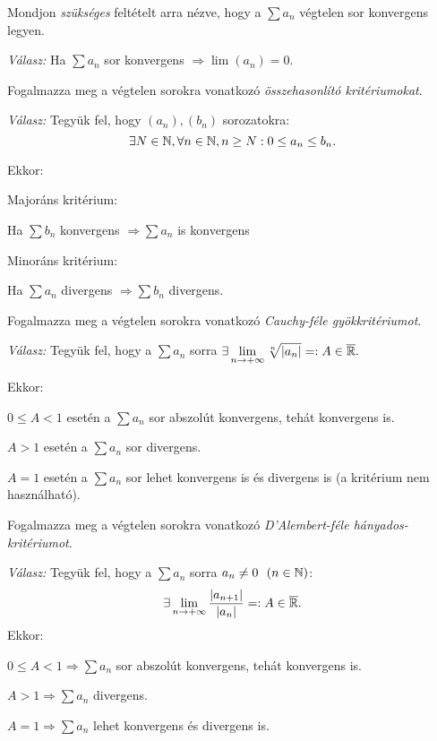 \documentclass[a4paper,12pt]{article}
\begin{document}
\begin{compactenum}
		\bigskip 
		\item Mondjon \emph{szükséges} feltételt arra nézve, hogy a $\sum a_n$ végtelen sor konvergens legyen.
		
		\emph{Válasz: } Ha $\sum a_n$ sor konvergens $\Rightarrow \lim(a_n)=0$.
		
		\bigskip 
		\item Fogalmazza meg a végtelen sorokra vonatkozó \emph{összehasonlító kritériumokat}.
		
		\emph{Válasz: } Tegyük fel, hogy $(a_n), (b_n)$ sorozatokra:
		\[\exists N \in \mathbb{N}, \forall n \in \mathbb{N}, n\ge N : 0\leq a_n \leq b_n.\]
		
		Ekkor:
		\begin{compactenum}
			\item Majoráns kritérium:
			
			Ha $\sum b_n$ konvergens $\Rightarrow \sum a_n$ is konvergens
			\item Minoráns kritérium:
			
			Ha $\sum a_n$ divergens $\Rightarrow \sum b_n$ divergens.
		\end{compactenum}
		
		\bigskip 
		\item Fogalmazza meg a végtelen sorokra vonatkozó \emph{Cauchy-féle gyökkritériumot}.
		
		\emph{Válasz:} Tegyük fel, hogy a $\sum a_n$ sorra $\exists\displaystyle\lim_{n\to +\infty} \sqrt[n]{|a_n|}=:A\in \overline{\mathbb{R}}.$
		
		Ekkor:
		\begin{compactitem}
			\item $0 \leq A <1$ esetén a $\sum a_n$ sor abszolút konvergens, tehát konvergens is.
			\item $A>1$ esetén a $\sum a_n$ sor divergens.
			\item $A=1$ esetén a $\sum a_n$ sor lehet konvergens is és divergens is (a kritérium nem használható).
		\end{compactitem}
		
		\bigskip 
		\item Fogalmazza meg a végtelen sorokra vonatkozó \emph{D’Alembert-féle hányados-kritériumot}.
		
		\emph{Válasz: } Tegyük fel, hogy a $\sum a_n$ sorra $a_n\not=0~~(n\in \mathbb{N})$:
		\[ \exists\lim_{n\to +\infty}\frac{|a_{n+1}|}{|a_n|} =: A\in \overline{\mathbb{R}} .\]
		Ekkor:
		\begin{compactitem}
			\item $0 \leq A <1 \Rightarrow \sum a_n$ sor abszolút konvergens, tehát konvergens is.
			\item $A>1 \Rightarrow \sum a_n$ divergens.
			\item $A=1 \Rightarrow \sum a_n$ lehet konvergens és divergens is.
		\end{compactitem}
		

\end{compactenum}
\end{document}

